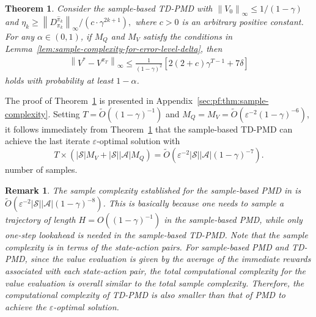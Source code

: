 \documentclass[10pt]{article}
\newcommand{\calA}{\mathcal{A}}
\newcommand{\calS}{\mathcal{S}}
\newcommand{\ls}{\left}
\newcommand{\rs}{\right}
\theoremstyle{plain}
\newtheorem{theorem}{Theorem}[section]
\newtheorem{remark}{Remark}[section]
\theoremstyle{definition}
\begin{document}
\begin{theorem} Consider the sample-based TD-PMD with $\ls\| V_0 \rs\|_\infty \leq {1}/{(1-\gamma)}$ and  $  \eta_k \geq {\ls\| {D}_{\pi_k}^{\widehat{\pi}_k} \rs\|_\infty}/{(c \cdot \gamma^{2k+1})},$
    where $c > 0$ is an arbitrary positive constant.
    For any $\alpha \in (0,1)$, if $M_Q$ and $M_V$ satisfy the conditions in Lemma~\ref{lem:sample-complexity-for-error-level-delta}, then 
    \begin{align*}
\ls\| V^*-V^{\pi _T}\rs\| _{\infty}\le \frac{1}{\left( 1-\gamma \right) ^2}\left[ 2\left( 2+c \right) \gamma ^{T-1}+7\delta \right]
    \end{align*}
   holds with probability at least $1-\alpha$.
    \label{thm:sample-complexity}
\end{theorem}
The proof of Theorem~\ref{thm:sample-complexity} is presented in Appendix~\ref{sec:pf:thm:sample-complexity}. Setting $T = \tilde{O}((1-\gamma)^{-1}
)$ and $M_Q=M_V=\tilde{O}(\varepsilon^{-2}(1-\gamma)^{-6})$, it follows immediately from Theorem~\ref{thm:sample-complexity} that the sample-based TD-PMD can achieve the last iterate $\varepsilon$-optimal solution with
\[
    T\times \ls(|\calS| M_V + |\calS||\calA| M_Q \rs) = \tilde{O} \ls( \varepsilon^{-2} |\calS||\calA| (1-\gamma)^{-7} \rs).
\]
number of samples. 
\begin{remark}
The sample complexity established for the sample-based PMD in \textup{\cite{Xiao_2022, Johnson_Pike-Burke_Rebeschini_2023}} is  $\tilde{O}(\varepsilon^{-2}|\calS||\calA|(1-\gamma)^{-8})$. This is basically because one needs to sample a trajectory of length $H=O((1-\gamma)^{-1})$ in the sample-based PMD, while only one-step lookahead is needed in the sample-based TD-PMD.  {Note that the sample complexity is in terms of the state-action pairs. For sample-based PMD and TD-PMD, since the value evaluation is given by the average of the immediate rewards associated with each
state-action pair, the total computational complexity for the value evaluation is overall similar to the
total sample complexity. Therefore, the computational complexity of TD-PMD is also smaller than that of PMD to achieve the $\varepsilon$-optimal solution.}

\end{remark}
\end{document}
